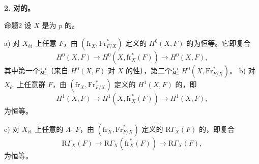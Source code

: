 \textbf{2. 对的。}
\begin{SGAresult}{命题}{2}
设 $X$ 是为 $p$ 的。

a) 对 $X_{\text{ét}}$ 上任意 $F$，由 $(\mathrm{fr}_X,\mathrm{Fr}_{F/X}^{*})$ 定义的 $H^0(X,F)$ 的为恒等。它即复合
\[
H^0(X,F)\longrightarrow H^0(X,\mathrm{fr}_X^*(F))\longrightarrow H^0(X,F),
\]
其中第一个是（来自 $H^0(X,F)$ 对 $X$ 的性），第二个是 $H^0(X,\mathrm{Fr}_{F/X}^{*})$。
b) 对 $X_{\text{ét}}$ 上任意群 $F$，由 $(\mathrm{fr}_X,\mathrm{Fr}_{F/X}^{*})$ 定义的 $H^1(X,F)$ 的，即
\[
H^1(X,F)\longrightarrow H^1(X,\mathrm{fr}_X^*(F))\longrightarrow H^1(X,F),
\]
为恒等。

c) 对 $X_{\text{ét}}$ 上任意的 $\Lambda$- $F$，由 $(\mathrm{fr}_X,\mathrm{Fr}_{F/X}^{*})$ 定义的 $\mathrm R\Gamma_X(F)$ 的，即复合
\[
\mathrm R\Gamma_X(F)\longrightarrow\mathrm R\Gamma_X(\mathrm{fr}_X^*(F))\longrightarrow\mathrm R\Gamma_X(F),
\]
为恒等。
\end{SGAresult}
